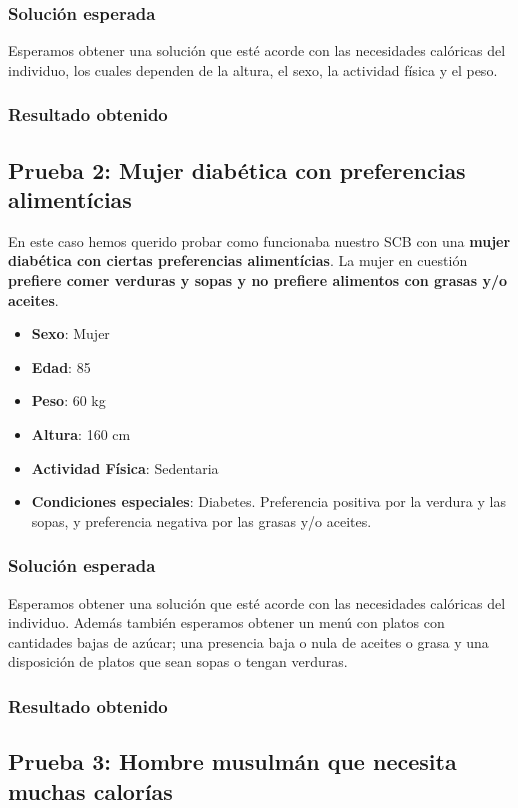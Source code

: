 \documentclass[11]{article}
\begin{document}
\subsubsection{Solución esperada}
Esperamos obtener una solución que esté acorde con las necesidades calóricas del individuo, los cuales dependen de la altura, el sexo, la actividad física y el peso.

\subsubsection{Resultado obtenido}

\subsection{Prueba 2: Mujer diabética con preferencias alimentícias}
En este caso hemos querido probar como funcionaba nuestro SCB con una \textbf{mujer diabética con ciertas preferencias alimentícias}. La mujer en cuestión \textbf{prefiere comer verduras y sopas y no prefiere alimentos con grasas y/o aceites}.  

\begin{itemize}
\item \textbf{Sexo}: Mujer
\item \textbf{Edad}: 85
\item \textbf{Peso}: 60 kg
\item \textbf{Altura}: 160 cm
\item \textbf{Actividad Física}: Sedentaria
\item \textbf{Condiciones especiales}: Diabetes. Preferencia positiva por la verdura y las sopas, y preferencia negativa por las grasas y/o aceites.
\end{itemize}

\subsubsection{Solución esperada}
Esperamos obtener una solución que esté acorde con las necesidades calóricas del individuo. Además también esperamos obtener un menú con platos con cantidades bajas de azúcar; una presencia baja o nula de aceites o grasa y una disposición de platos que sean sopas o tengan verduras.

\subsubsection{Resultado obtenido}

\subsection{Prueba 3: Hombre musulmán que necesita muchas calorías}
\end{document}
